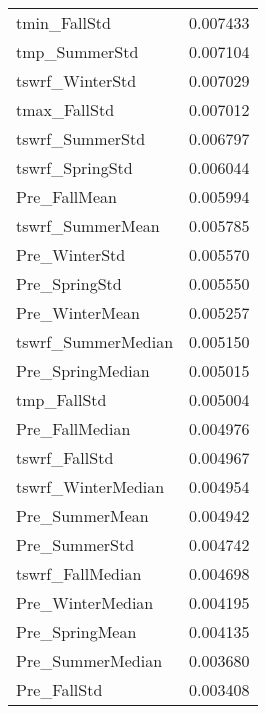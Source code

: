 \begin{tabular}{lr}
tmin_FallStd & 0.007433 \\
tmp_SummerStd & 0.007104 \\
tswrf_WinterStd & 0.007029 \\
tmax_FallStd & 0.007012 \\
tswrf_SummerStd & 0.006797 \\
tswrf_SpringStd & 0.006044 \\
Pre_FallMean & 0.005994 \\
tswrf_SummerMean & 0.005785 \\
Pre_WinterStd & 0.005570 \\
Pre_SpringStd & 0.005550 \\
Pre_WinterMean & 0.005257 \\
tswrf_SummerMedian & 0.005150 \\
Pre_SpringMedian & 0.005015 \\
tmp_FallStd & 0.005004 \\
Pre_FallMedian & 0.004976 \\
tswrf_FallStd & 0.004967 \\
tswrf_WinterMedian & 0.004954 \\
Pre_SummerMean & 0.004942 \\
Pre_SummerStd & 0.004742 \\
tswrf_FallMedian & 0.004698 \\
Pre_WinterMedian & 0.004195 \\
Pre_SpringMean & 0.004135 \\
Pre_SummerMedian & 0.003680 \\
Pre_FallStd & 0.003408 \\
\bottomrule
\end{tabular}
